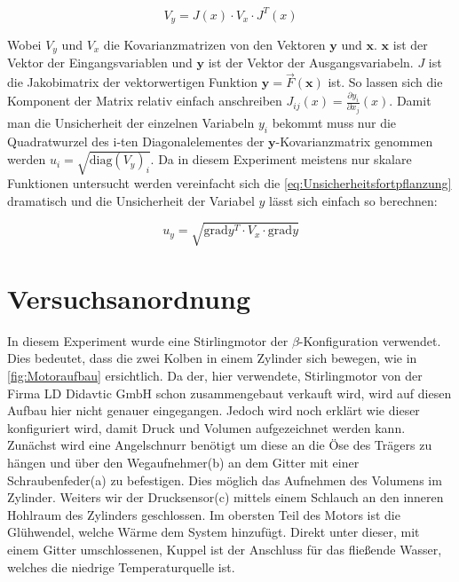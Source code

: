 \documentclass[11pt]{scrartcl}
\begin{document}
\begin{equation}
    \label{eq:Unsicherheitsfortpflanzung}
    V_y = J(x) \cdot V_x \cdot J^{T}(x)
\end{equation}

Wobei $V_y$ und $V_x$ die Kovarianzmatrizen von den Vektoren $\bm{y}$ und $\bm{x}$.
$\bm{x}$ ist der Vektor der Eingangsvariablen und $\bm{y}$ ist der Vektor der Ausgangsvariabeln.
$J$ ist die Jakobimatrix der vektorwertigen Funktion $\bm{y} = \vec{F}(\bm{x})$ ist.
So lassen sich die Komponent der Matrix relativ einfach anschreiben $J_{ij}(x) = \frac{\partial{y_i}}{\partial{x_j}}(x)$.
Damit man die Unsicherheit der einzelnen Variabeln $y_i$ bekommt muss nur die Quadratwurzel des i-ten Diagonalelementes der 
$\bm{y}$-Kovarianzmatrix genommen werden $u_i= \sqrt{\mathrm{diag}(V_y)_i}$.
Da in diesem Experiment meistens nur skalare Funktionen untersucht werden vereinfacht
sich die \autoref{eq:Unsicherheitsfortpflanzung} dramatisch und die Unsicherheit
der Variabel $y$ lässt sich einfach so berechnen:

\begin{equation}
    \label{eq:graduncentainty}
    u_y = \sqrt{\mathrm{grad} y^T \cdot V_x \cdot \mathrm{grad} y}
\end{equation}

\section{Versuchsanordnung}
\label{sec:versuchsanordnung}
In diesem Experiment wurde eine Stirlingmotor der $\beta$-Konfiguration
verwendet. Dies bedeutet, dass die zwei Kolben in einem Zylinder sich 
bewegen, wie in \autoref{fig:Motoraufbau} ersichtlich. Da der, hier
verwendete, Stirlingmotor von der Firma LD Didavtic GmbH schon 
zusammengebaut verkauft wird, wird auf diesen Aufbau hier nicht
genauer eingegangen. Jedoch wird noch erklärt wie dieser konfiguriert
wird, damit Druck und Volumen aufgezeichnet werden kann. Zunächst
wird eine Angelschnurr benötigt um diese an die Öse des Trägers zu hängen
und über den Wegaufnehmer(b) an dem Gitter mit einer Schraubenfeder(a) zu 
befestigen. Dies möglich das Aufnehmen des Volumens im Zylinder. Weiters
wir der Drucksensor(c) mittels einem Schlauch an den inneren Hohlraum
des Zylinders geschlossen. Im obersten Teil des Motors ist die Glühwendel,
welche Wärme dem System hinzufügt. Direkt unter dieser, mit einem Gitter
umschlossenen, Kuppel ist der Anschluss für das fließende Wasser, welches
die niedrige Temperaturquelle ist.
\end{document}
